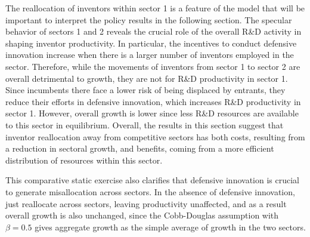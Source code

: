 The reallocation of inventors within sector 1 is a feature of the
model that will be important to interpret the policy results in the
following section. The specular behavior of sectors 1 and 2 reveals
the crucial role of the overall R\&D activity in shaping inventor
productivity. In particular, the incentives to conduct defensive innovation
increase when there is a larger number of inventors employed in the
sector. Therefore, while the movements of inventors from sector 1
to sector 2 are overall detrimental to growth, they are not for R\&D
productivity in sector 1. Since incumbents there face a lower risk
of being displaced by entrants, they reduce their efforts in defensive
innovation, which increases R\&D productivity in sector 1. However,
overall growth is lower since less R\&D resources are available to
this sector in equilibrium. Overall, the results in this section suggest
that inventor reallocation away from competitive sectors has both
costs, resulting from a reduction in sectoral growth, and benefits,
coming from a more efficient distribution of resources within this
sector. 

This comparative static exercise also clarifies that defensive innovation
is crucial to generate misallocation across sectors. In the absence
of defensive innovation, just reallocate across sectors, leaving productivity
unaffected, and as a result overall growth is also unchanged, since
the Cobb-Douglas assumption with $\beta=0.5$ gives aggregate growth
as the simple average of growth in the two sectors.

